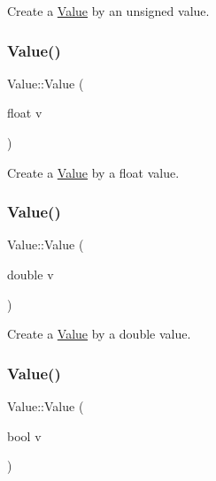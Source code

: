 Create a \hyperlink{classValue}{Value} by an unsigned value. \mbox{\label{classValue_a522f9e03113fc05bab847df24c68c648}} 
\subsubsection{\texorpdfstring{Value()}{Value()}\hspace{0.1cm}{\footnotesize\ttfamily [5/34]}}
{\footnotesize\ttfamily Value\+::\+Value (\begin{DoxyParamCaption}\item[{float}]{v }\end{DoxyParamCaption})\hspace{0.3cm}{\ttfamily [explicit]}}

Create a \hyperlink{classValue}{Value} by a float value. \mbox{\label{classValue_ac23a80a895f9777f1c7f61f62483d632}} 
\subsubsection{\texorpdfstring{Value()}{Value()}\hspace{0.1cm}{\footnotesize\ttfamily [6/34]}}
{\footnotesize\ttfamily Value\+::\+Value (\begin{DoxyParamCaption}\item[{double}]{v }\end{DoxyParamCaption})\hspace{0.3cm}{\ttfamily [explicit]}}

Create a \hyperlink{classValue}{Value} by a double value. \mbox{\label{classValue_acbcf978c0d65b9b506277cc11bc49c8e}} 
\subsubsection{\texorpdfstring{Value()}{Value()}\hspace{0.1cm}{\footnotesize\ttfamily [7/34]}}
{\footnotesize\ttfamily Value\+::\+Value (\begin{DoxyParamCaption}\item[{bool}]{v }\end{DoxyParamCaption})\hspace{0.3cm}{\ttfamily [explicit]}}

